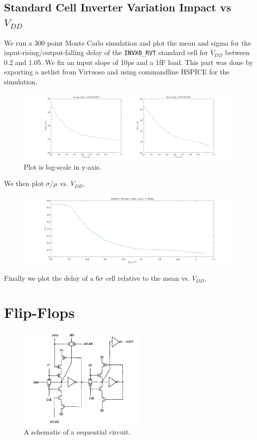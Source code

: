 \documentclass[11pt]{article}
\begin{document}
\subsection{Standard Cell Inverter Variation Impact vs $V_{DD}$}
We run a 300 point Monte Carlo simulation and plot the mean and sigma for the input-rising/output-falling delay of the \verb|INVX0_RVT| standard cell for $V_{DD}$ between 0.2 and 1.05. We fix an input slope of 10ps and a 1fF load. This part was done by exporting a netlist from Virtuoso and using commandline HSPICE for the simulation.

\begin{figure}[H]
	\centerline{\includegraphics[width=\textwidth+4cm]{delay_vs_vdd.png}}
	\caption{Plot is log-scale in y-axis.}
\end{figure}

We then plot $\sigma / \mu$ vs. $V_{DD}$.

\begin{figure}[H]
	\centerline{\includegraphics[width=\textwidth+4cm]{relative_delay_variation_vs_vdd.png}}
\end{figure}

Finally we plot the delay of a $6 \sigma$ cell relative to the mean vs. $V_{DD}$.


\section{Flip-Flops}
\begin{figure}[H]
	\centerline{\includegraphics[height=5cm]{flip_flop_schematic.jpg}}
	\caption{A schematic of a sequential circuit.}
\end{figure}
\end{document}
